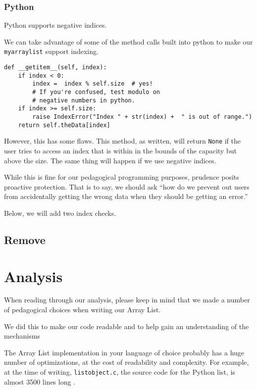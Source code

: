 \subsubsection{Python}

Python supports negative indices.  

We can take advantage of some of the method calls built into python to make our \texttt{myarraylist} support indexing.

\begin{verbatim}
def __getitem__(self, index):
	if index < 0: 
		index =  index % self.size  # yes! 
		# If you're confused, test modulo on 
		# negative numbers in python.
	if index >= self.size:
		raise IndexError("Index " + str(index) +  " is out of range.")       
	return self.theData[index]
\end{verbatim}

However, this has some flaws.
This method, as written, will return \texttt{None} if the user tries to access an index that is within in the bounds of the capacity but above the size.
The same thing will happen if we use negative indices.

While this is fine for our pedagogical programming purposes, prudence posits proactive protection.  That is to say, we should ask ``how do we prevent out users from accidentally getting the wrong data when they should be getting an error.''

Below, we will add two index checks.

\subsection{Remove}



\section{Analysis}

When reading through our analysis, please keep in mind that we made a number of pedagogical choices when writing our Array List. 

We did this to make our code readable and to help gain an understanding of the mechanisms 

The Array List implementation in your language of choice probably has a huge number of optimizations, at the cost of readability and complexity.  For example, at the time of writing, \texttt{listobject.c}, the source code for the Python list, is almost 3500 lines long \cite{py-list-source}.


